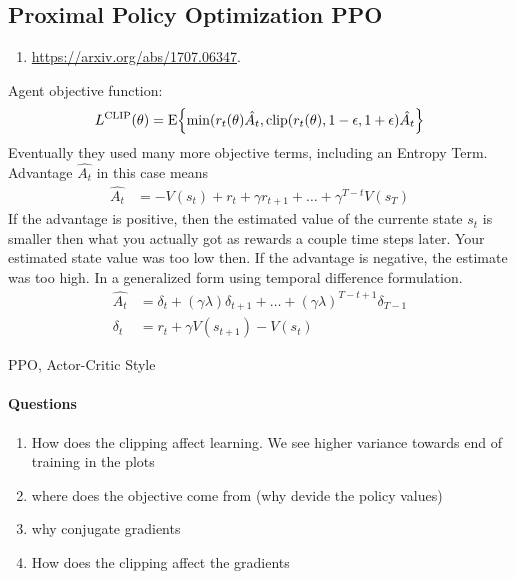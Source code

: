 \subsection{Proximal Policy Optimization PPO}
\newcommand{\oldpolicy}[2]{\pi_{\theta_{\mathrm{old}}} ( {#1} | {#2})}
\begin{enumerate}
	\item \url{https://arxiv.org/abs/1707.06347}. 
\end{enumerate}
Agent objective function:
\begin{align}
	L^{\mathrm{CLIP}}( \theta) 
	= \mathrm{E}\!\left\{{
		\min(r_t(\theta) \hat{A_t}, \mathrm{clip}(r_t(\theta), 1-\epsilon, 1+\epsilon) \hat{A_t}
	}\right\}
\end{align}
Eventually they used many more objective terms, including an Entropy Term.
Advantage $\hat{A_t}$ in this case means
\begin{align}
	\hat{A_t} &= -V(s_t) + r_t + \gamma r_{t+1} + \dots + \gamma^{T-t}V(s_T)
\end{align}
If the advantage is positive, then the estimated value of the currente state $s_t$ is smaller then what you actually got
as rewards a couple time steps later. Your estimated state value was too low then.
If the advantage is negative, the estimate was too high.
In a generalized form using temporal difference formulation.
\begin{align}
	\hat{A_t} &= \delta_t + (\gamma \lambda)\delta_{t+1} + \dots + (\gamma\lambda)^{T-t+1}\delta_{T-1} \\
	\delta_t &= r_t + \gamma V(s_{t+1}) - V(s_t)
\end{align}

\begin{algorithm}[H]
	\caption{PPO, Actor-Critic Style}
\end{algorithm}


\paragraph{Questions}
\begin{enumerate}
	\item How does the clipping affect learning. We see higher variance towards end of training in the plots
	\item where does the objective come from (why devide the policy values)
	\item why conjugate gradients
	\item How does the clipping affect the gradients
\end{enumerate}
